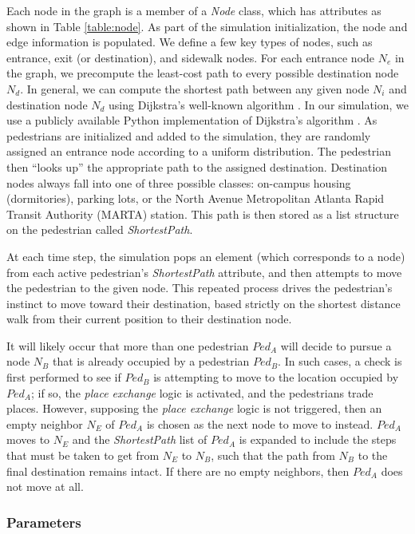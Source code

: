 \documentclass[12pt]{article}
\begin{document}
Each node in the graph is a member of a \textit{Node} class, which
has attributes as shown in Table \ref{table:node}. As part of the simulation
initialization, the node and edge information is
populated. We define a few key types of nodes, such as entrance, exit (or
destination), and sidewalk nodes. For each entrance node $N_e$ in the graph, we
precompute the least-cost path to every possible destination node $N_d$.
In general,
we can compute the shortest path between any given node $N_i$ and destination
node $N_d$ using Dijkstra's well-known algorithm \cite{dijkstra1959note}. In our
simulation, we use a publicly available Python implementation of Dijkstra's
algorithm \cite{eppstein-dijkstra}. As pedestrians are initialized and added to
the simulation, they are randomly assigned an entrance node according to a
uniform distribution. The pedestrian then ``looks up'' the appropriate path
to the assigned destination. Destination nodes always fall into one of three
possible classes: on-campus
housing (dormitories), parking lots, or the North Avenue Metropolitan Atlanta
Rapid Transit Authority (MARTA) station. This path is then stored as a list
structure on the
pedestrian called \textit{ShortestPath}.

At each time step, the simulation pops an element (which corresponds to a node)
from each active pedestrian's \textit{ShortestPath} attribute, and then attempts
to move the pedestrian to the given node. This repeated process drives the
pedestrian's instinct to move toward their destination, based strictly on the
shortest distance walk from their current position to their destination node.

It will likely occur that more than one pedestrian $Ped_A$ will decide to pursue
a node $N_B$ that is already occupied by a pedestrian $Ped_B$. In such cases, a
check is first performed to see if $Ped_B$ is attempting to move to the location
occupied by $Ped_A$; if so, the \textit{place exchange} logic
\cite{blue2001cellular}
is activated, and the pedestrians trade places. However, supposing the
\textit{place exchange} logic is not triggered, then an empty neighbor $N_E$ of
$Ped_A$ is chosen as the next node to move to instead. $Ped_A$ moves to $N_E$ and
the \textit{ShortestPath} list of $Ped_A$ is expanded to include the steps
that must be taken to get from $N_E$ to $N_B$, such that the path from $N_B$ to
the final destination remains intact.  If there are no empty neighbors, then
$Ped_A$ does not move at all.

\subsubsection{Parameters}
\end{document}

